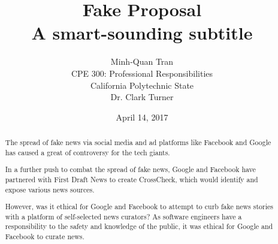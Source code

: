 


\title{\vfill Fake Proposal\\
\vspace{8pt}
\normalsize{A smart-sounding subtitle}
}

\author{Minh-Quan Tran\\
\normalsize{CPE 300: Professional Responsibilities}\\
\normalsize{California Polytechnic State}\\
\normalsize{Dr. Clark Turner}
}

\date{April 14, 2017}

\maketitle


\vfill

\begin{abstract}
The spread of fake news via social media and ad platforms like Facebook and Google has caused a great of controversy for the tech giants. \cite{telegraph_fake_news}

In a further push to combat the spread of fake news, Google and Facebook have partnered with First Draft News to create CrossCheck, \cite{crosscheck_launch} which would identify and expose various news sources.

However, was it ethical for Google and Facebook to attempt to curb fake news stories with a platform of self-selected news curators? As software engineers have a responsibility to the safety and knowledge of the public, it was ethical for Google and Facebook to curate news.
\end{abstract}

\thispagestyle{empty} 
\pagebreak